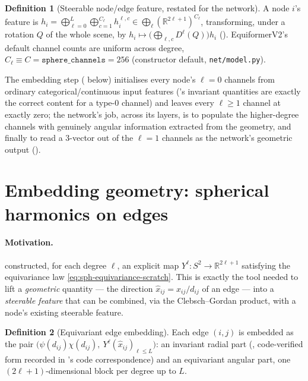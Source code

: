 \documentclass[11pt,a4paper]{report}
\theoremstyle{definition}
\newtheorem{definition}[definition]{Definition}
\theoremstyle{remark}
\newcommand{\RR}{\mathbb R}
\newcommand{\file}[1]{\texttt{#1}}
\begin{document}
\begin{definition}[Steerable node/edge feature, restated for the network]
\label{def:steerable-network-feature}
A node $i$'s feature is
$h_i = \bigoplus_{\ell=0}^L\bigoplus_{c=1}^{C_\ell}h_i^{\ell,c}\in\bigoplus_\ell(\RR^{2\ell+1})^{C_\ell}$,
transforming, under a rotation $Q$ of the whole scene, by
$h_i\mapsto\bigl(\bigoplus_{\ell,c}D^\ell(Q)\bigr)h_i$
(). EquiformerV2's default channel counts are
uniform across degree, $C_\ell\equiv C=\texttt{sphere\_channels}=256$
(constructor default, \file{net/model.py}).
\end{definition}

The embedding step ( below) initialises every
node's $\ell=0$ channels from ordinary categorical/continuous input
features ('s invariant quantities are
exactly the correct content for a type-$0$ channel) and leaves every
$\ell\ge1$ channel at exactly zero; the network's job, across its layers,
is to populate the higher-degree channels with genuinely angular
information extracted from the geometry, and finally to read a $3$-vector
out of the $\ell=1$ channels as the network's geometric output
().

\section{Embedding geometry: spherical harmonics on edges}
\label{sec:edge-embedding-scratch}

\paragraph{Motivation.}  constructed, for each
degree $\ell$, an explicit map $Y^\ell:S^2\to\RR^{2\ell+1}$ satisfying the
equivariance law \eqref{eq:sph-equivariance-scratch}. This is exactly the
tool needed to lift a \emph{geometric} quantity --- the direction
$\hat x_{ij}=x_{ij}/d_{ij}$ of an edge --- into a \emph{steerable feature}
that can be combined, via the Clebsch--Gordan product, with a node's
existing steerable feature.

\begin{definition}[Equivariant edge embedding]
\label{def:edge-embedding-scratch}
Each edge $(i,j)$ is embedded as the pair
$\bigl(\psi(d_{ij})\chi(d_{ij}),\ Y^\ell(\hat x_{ij})_{\ell\le L}\bigr)$: an
invariant radial part (, code-verified form recorded in
's code correspondence) and an equivariant angular
part, one $(2\ell+1)$-dimensional block per degree up to $L$.
\end{definition}
\end{document}
